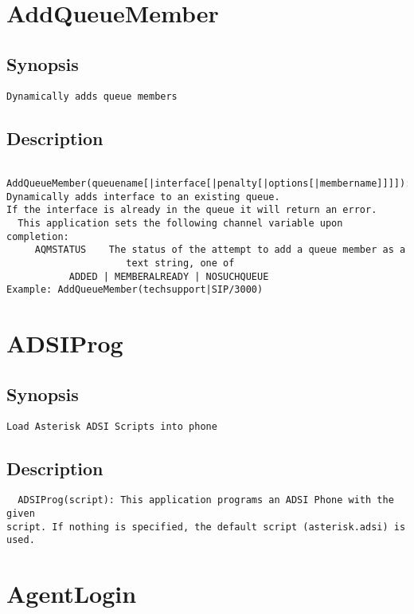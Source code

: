 \section{AddQueueMember}
\subsection{Synopsis}
\begin{verbatim}
Dynamically adds queue members
\end{verbatim}
\subsection{Description}
\begin{verbatim}
   AddQueueMember(queuename[|interface[|penalty[|options[|membername]]]]):
Dynamically adds interface to an existing queue.
If the interface is already in the queue it will return an error.
  This application sets the following channel variable upon completion:
     AQMSTATUS    The status of the attempt to add a queue member as a 
                     text string, one of
           ADDED | MEMBERALREADY | NOSUCHQUEUE 
Example: AddQueueMember(techsupport|SIP/3000)

\end{verbatim}


\section{ADSIProg}
\subsection{Synopsis}
\begin{verbatim}
Load Asterisk ADSI Scripts into phone
\end{verbatim}
\subsection{Description}
\begin{verbatim}
  ADSIProg(script): This application programs an ADSI Phone with the given
script. If nothing is specified, the default script (asterisk.adsi) is used.

\end{verbatim}


\section{AgentLogin}
